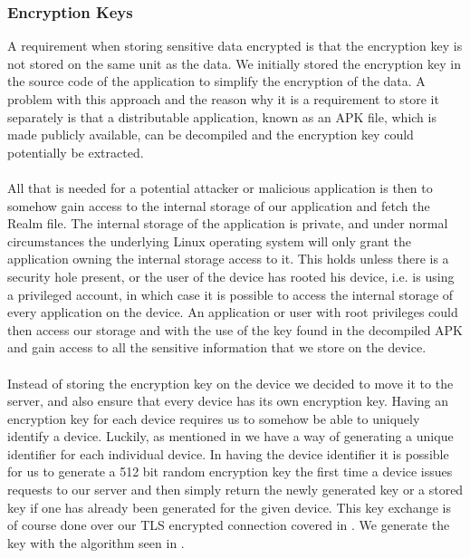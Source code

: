 \subsubsection{Encryption Keys}
\label{sub:encryption_keys}
A requirement when storing sensitive data encrypted is that the encryption key is not stored on the same unit as the data. We initially stored the encryption key in the source code of the application to simplify the encryption of the data. A problem with this approach and the reason why it is a requirement to store it separately is that a distributable application, known as an APK file, which is made publicly available, can be decompiled and the encryption key could potentially be extracted. 
\\\\
All that is needed for a potential attacker or malicious application is then to somehow gain access to the internal storage of our application and fetch the Realm file. The internal storage of the application is private, and under normal circumstances the underlying Linux operating system will only grant the application owning the internal storage access to it. This holds unless there is a security hole present, or the user of the device has rooted his device, i.e. is using a privileged account, in which case it is possible to access the internal storage of every application on the device. An application or user with root privileges could then access our storage and with the use of the key found in the decompiled APK and gain access to all the sensitive information that we store on the device.
\\\\
Instead of storing the encryption key on the device we decided to move it to the server, and also ensure that every device has its own encryption key. Having an encryption key for each device requires us to somehow be able to uniquely identify a device. Luckily, as mentioned in  we have a way of generating a unique identifier for each individual device. In having the device identifier it is possible for us to generate a 512 bit random encryption key the first time a device issues requests to our server and then simply return the newly generated key or a stored key if one has already been generated for the given device. This key exchange is of course done over our TLS encrypted connection covered in . We generate the key with the algorithm seen in . 



